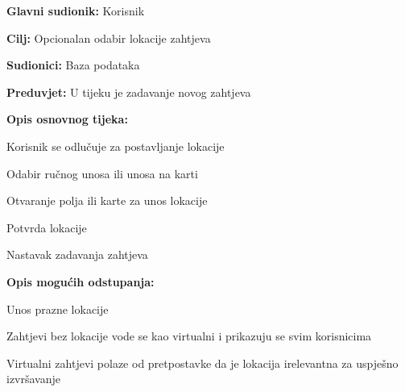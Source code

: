 		
			\noindent {}
			\begin{packed_item}
				
				\item \textbf{Glavni sudionik: }Korisnik
				\item  \textbf{Cilj:} Opcionalan odabir lokacije zahtjeva
				\item  \textbf{Sudionici:} Baza podataka
				\item  \textbf{Preduvjet:} U tijeku je zadavanje novog zahtjeva
				\item  \textbf{Opis osnovnog tijeka:}
				
				\item[] \begin{packed_enum}
					
					\item Korisnik se odlučuje za postavljanje lokacije
					\item Odabir ručnog unosa ili unosa na karti
					\item Otvaranje polja ili karte za unos lokacije
					\item Potvrda lokacije
					\item Nastavak zadavanja zahtjeva
				\end{packed_enum}
				
				\item  \textbf{Opis mogućih odstupanja:}
				
				\item[] \begin{packed_item}
					
					\item[3.a] Unos prazne lokacije
					\item[] \begin{packed_enum}
						
						\item Zahtjevi bez lokacije vode se kao virtualni i prikazuju se svim korisnicima
						\item Virtualni zahtjevi polaze od pretpostavke da je lokacija irelevantna za uspješno izvršavanje
						
					\end{packed_enum}
					
					
				\end{packed_item}
			\end{packed_item}
		
